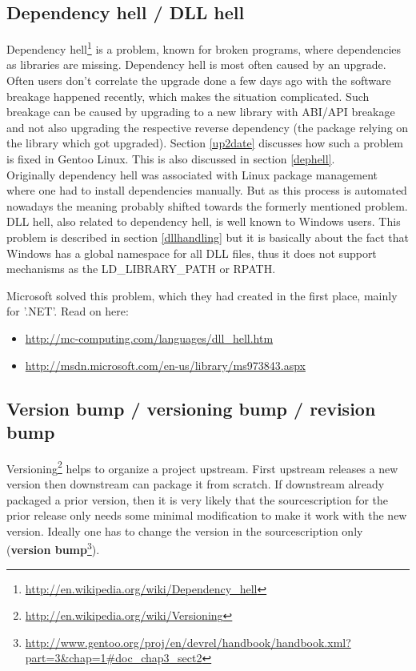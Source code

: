 \documentclass[a4paper,10pt]{article}
\begin{document}
\subsection{Dependency hell / DLL hell}
\label{dependencyhell}
Dependency hell\footnote{\url{http://en.wikipedia.org/wiki/Dependency_hell}} is a problem, known for broken programs, where dependencies as libraries are missing. Dependency hell is most often caused by an upgrade. Often users don't correlate the upgrade done a few days ago with the software breakage happened recently, which makes the situation complicated. Such breakage can be caused by upgrading to a new library with ABI/API breakage and not also upgrading the respective reverse dependency (the package relying on the library which got upgraded). Section \ref{up2date} discusses how such a problem is fixed in Gentoo Linux. This is also discussed in section \ref{dephell}.\\

Originally dependency hell was associated with Linux package management where one had to install dependencies manually. But as this process is automated nowadays the meaning probably shifted towards the formerly mentioned problem.\\

DLL hell, also related to dependency hell, is well known to Windows users. This problem is described in section \ref{dllhandling} but it is basically about the fact that Windows has a global namespace for all DLL files, thus it does not support mechanisms as the LD\_LIBRARY\_PATH or RPATH.

Microsoft solved this problem, which they had created in the first place, mainly for '.NET'. Read on here:
\begin{itemize}
\item \url{http://mc-computing.com/languages/dll_hell.htm}
\item \url{http://msdn.microsoft.com/en-us/library/ms973843.aspx}
\end{itemize}







\subsection{Version bump / versioning bump / revision bump}
Versioning\footnote{\url{http://en.wikipedia.org/wiki/Versioning}} helps to organize a project upstream. First upstream releases a new version then downstream can package it from scratch. If downstream already packaged a prior version, then it is very likely that the sourcescription for the prior release only needs some minimal modification to make it work with the new version. Ideally one has to change the version in the sourcescription only (\textbf{version bump}\footnote{\url{http://www.gentoo.org/proj/en/devrel/handbook/handbook.xml?part=3&chap=1\#doc_chap3_sect2}}).
\end{document}
